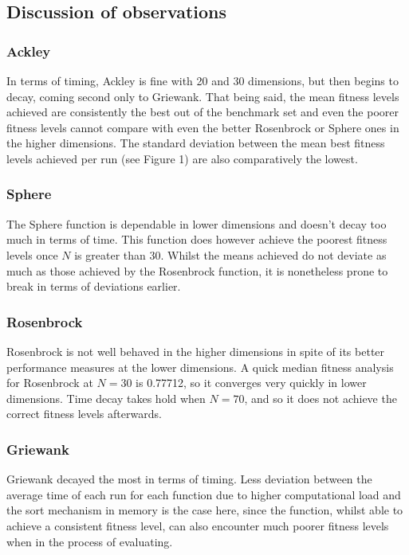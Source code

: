 \documentclass[KomodoMain.tex]{subfiles}
\begin{document}
\newpage
\subsection{Discussion of observations}  

\subsubsection{Ackley}

In terms of timing, Ackley is fine with 20 and 30 dimensions, but then begins to decay, coming second only to Griewank. That being said, the mean fitness levels achieved are consistently the best out of the benchmark set and even the poorer fitness levels cannot compare with even the better Rosenbrock or Sphere ones in the higher dimensions. The standard deviation between the mean best fitness levels achieved per run (see Figure 1) are also comparatively the lowest.

\subsubsection{Sphere}

The Sphere function is dependable in lower dimensions and doesn't decay too much in terms of time. This function does however achieve the poorest fitness levels once $N$ is greater than $30$. Whilst the means achieved do not deviate as much as those achieved by the Rosenbrock function, it is nonetheless prone to break in terms of deviations earlier.

\subsubsection{Rosenbrock}

Rosenbrock is not well behaved in the higher dimensions in spite of its better performance measures at the lower dimensions. A quick median fitness analysis for Rosenbrock at $N=30$ is 0.77712, so it converges very quickly in lower dimensions. Time decay takes hold when $N=70$, and so it does not achieve the correct fitness levels afterwards.

\subsubsection{Griewank}

Griewank decayed the most in terms of timing. Less deviation between the average time of each run for each function due to higher computational load and the sort mechanism in memory is the case here, since the function, whilst able to achieve a consistent fitness level, can also encounter much poorer fitness levels when in the process of evaluating.
\end{document}
